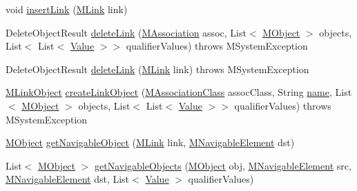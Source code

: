 \begin{DoxyCompactItemize}
\item 
void \hyperlink{classorg_1_1tzi_1_1use_1_1uml_1_1sys_1_1_m_system_state_acb7cab9d9c3630c43ab465432a0dd5aa}{insert\-Link} (\hyperlink{interfaceorg_1_1tzi_1_1use_1_1uml_1_1sys_1_1_m_link}{M\-Link} link)
\item 
Delete\-Object\-Result \hyperlink{classorg_1_1tzi_1_1use_1_1uml_1_1sys_1_1_m_system_state_ae1f7b234a2a18f6808fbd28a5d6c230d}{delete\-Link} (\hyperlink{interfaceorg_1_1tzi_1_1use_1_1uml_1_1mm_1_1_m_association}{M\-Association} assoc, List$<$ \hyperlink{interfaceorg_1_1tzi_1_1use_1_1uml_1_1sys_1_1_m_object}{M\-Object} $>$ objects, List$<$ List$<$ \hyperlink{classorg_1_1tzi_1_1use_1_1uml_1_1ocl_1_1value_1_1_value}{Value} $>$$>$ qualifier\-Values)  throws M\-System\-Exception 
\item 
Delete\-Object\-Result \hyperlink{classorg_1_1tzi_1_1use_1_1uml_1_1sys_1_1_m_system_state_a270dee47d7ced973b89ce05fef0bc37f}{delete\-Link} (\hyperlink{interfaceorg_1_1tzi_1_1use_1_1uml_1_1sys_1_1_m_link}{M\-Link} link)  throws M\-System\-Exception 
\item 
\hyperlink{interfaceorg_1_1tzi_1_1use_1_1uml_1_1sys_1_1_m_link_object}{M\-Link\-Object} \hyperlink{classorg_1_1tzi_1_1use_1_1uml_1_1sys_1_1_m_system_state_a45f0cc4fd3398b1e90b4c4b2ceca7896}{create\-Link\-Object} (\hyperlink{interfaceorg_1_1tzi_1_1use_1_1uml_1_1mm_1_1_m_association_class}{M\-Association\-Class} assoc\-Class, String \hyperlink{classorg_1_1tzi_1_1use_1_1uml_1_1sys_1_1_m_system_state_a83de7299fed54e980318e06d26dc9976}{name}, List$<$ \hyperlink{interfaceorg_1_1tzi_1_1use_1_1uml_1_1sys_1_1_m_object}{M\-Object} $>$ objects, List$<$ List$<$ \hyperlink{classorg_1_1tzi_1_1use_1_1uml_1_1ocl_1_1value_1_1_value}{Value} $>$$>$ qualifier\-Values)  throws M\-System\-Exception 
\item 
\hyperlink{interfaceorg_1_1tzi_1_1use_1_1uml_1_1sys_1_1_m_object}{M\-Object} \hyperlink{classorg_1_1tzi_1_1use_1_1uml_1_1sys_1_1_m_system_state_a9f1de2c7d4feabec1744a8b7dae9ebdc}{get\-Navigable\-Object} (\hyperlink{interfaceorg_1_1tzi_1_1use_1_1uml_1_1sys_1_1_m_link}{M\-Link} link, \hyperlink{interfaceorg_1_1tzi_1_1use_1_1uml_1_1mm_1_1_m_navigable_element}{M\-Navigable\-Element} dst)
\item 
List$<$ \hyperlink{interfaceorg_1_1tzi_1_1use_1_1uml_1_1sys_1_1_m_object}{M\-Object} $>$ \hyperlink{classorg_1_1tzi_1_1use_1_1uml_1_1sys_1_1_m_system_state_a015bb1a389e961505894c40ff6138eed}{get\-Navigable\-Objects} (\hyperlink{interfaceorg_1_1tzi_1_1use_1_1uml_1_1sys_1_1_m_object}{M\-Object} obj, \hyperlink{interfaceorg_1_1tzi_1_1use_1_1uml_1_1mm_1_1_m_navigable_element}{M\-Navigable\-Element} src, \hyperlink{interfaceorg_1_1tzi_1_1use_1_1uml_1_1mm_1_1_m_navigable_element}{M\-Navigable\-Element} dst, List$<$ \hyperlink{classorg_1_1tzi_1_1use_1_1uml_1_1ocl_1_1value_1_1_value}{Value} $>$ qualifier\-Values)

\end{DoxyCompactItemize}
